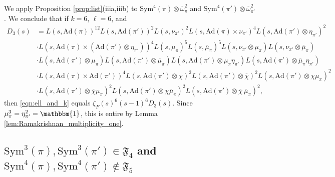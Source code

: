 \documentclass[11pt]{amsart}
\theoremstyle{remark}
\numberwithin{equation}{section}
\begin{document}
We apply Proposition \ref{prop:list}(iiia,iiib) to $\mathrm{Sym}^4(\pi)\otimes\overline{\omega}_{\pi}^{2}$  and $\mathrm{Sym}^4(\pi')\otimes\overline{\omega}_{\pi'}^{2}$. We conclude that if $k=6$, $\ell=6$, and
\begin{align*}
D_3(s)&=L(s,\mathrm{Ad}(\pi))^{12} L(s,\mathrm{Ad}(\pi'))^{2} L(s, \nu_{\pi'})^2 L(s,\mathrm{Ad}(\pi)\times \nu_{\pi'})^4 L(s,\mathrm{Ad}(\pi')\otimes\eta_{\pi'})^2\\
&\cdot L(s,\mathrm{Ad}(\pi)\times(\mathrm{Ad}(\pi')\otimes\eta_{\pi'}))^4 L(s,\mu_{\pi})^5 L(s,\overline{\mu}_{\pi})^5 L(s,\nu_{\pi'}\otimes\mu_{\pi}) L(s,\nu_{\pi'}\otimes\overline{\mu}_{\pi})\\
&\cdot  L(s,\mathrm{Ad}(\pi')\otimes\mu_{\pi}) L(s,\mathrm{Ad}(\pi')\otimes\overline{\mu}_{\pi}) L(s,\mathrm{Ad}(\pi')\otimes\mu_{\pi}\eta_{\pi'}) L(s,\mathrm{Ad}(\pi')\otimes\overline{\mu}_{\pi}\eta_{\pi'})\\
&\cdot L(s,\mathrm{Ad}(\pi)\times\mathrm{Ad}(\pi'))^4 L(s,\mathrm{Ad}(\pi')\otimes\chi)^2 L(s,\mathrm{Ad}(\pi')\otimes\overline{\chi})^2 L(s,\mathrm{Ad}(\pi')\otimes\chi\mu_{\pi})^2\\
&\cdot  L(s,\mathrm{Ad}(\pi')\otimes\overline{\chi}\mu_{\pi})^2 L(s,\mathrm{Ad}(\pi')\otimes\chi\overline{\mu}_{\pi})^2 L(s,\mathrm{Ad}(\pi')\otimes\overline{\chi}\,\overline{\mu}_{\pi})^2,
\end{align*}
then \eqref{eqn:ell_and_k} equals $\zeta_F(s)^6 (s-1)^6 D_3(s)$.  Since $\mu_{\pi}^3=\eta_{\pi'}^2=\mathbbm{1}$, this is entire by Lemma \ref{lem:Ramakrishnan_multiplicity_one}.

\subsection{$\mathrm{Sym}^3(\pi),\mathrm{Sym}^3(\pi')\in\mathfrak{F}_{4}$ and $\mathrm{Sym}^4(\pi),\mathrm{Sym}^4(\pi')\notin\mathfrak{F}_{5}$}
\end{document}
